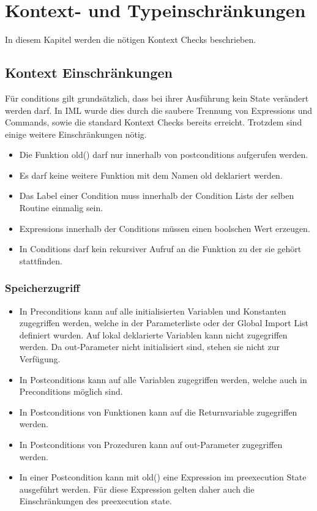 \section{Kontext- und Typeinschränkungen}
\label{sec:constraints}
In diesem Kapitel werden die nötigen Kontext Checks beschrieben.

\subsection{Kontext Einschränkungen}

Für conditions gilt grundsätzlich, dass bei ihrer Ausführung kein State verändert werden 
darf. In IML wurde dies durch die saubere Trennung von Expressions und Commands, sowie die standard
Kontext Checks bereits erreicht. Trotzdem sind einige weitere Einschränkungen nötig.

\begin{itemize}

\item Die Funktion old() darf nur innerhalb von postconditions aufgerufen werden.
\item Es darf keine weitere Funktion mit dem Namen old deklariert werden.
\item Das Label einer Condition muss innerhalb der Condition Lists der selben Routine einmalig sein.
\item Expressions innerhalb der Conditions müssen einen boolschen Wert erzeugen.
\item In Conditions darf kein rekursiver Aufruf an die Funktion zu der sie gehört stattfinden.

\end{itemize}

\subsubsection{Speicherzugriff}

\begin{itemize}
\item In Preconditions kann auf alle initialisierten Variablen und Konstanten zugegriffen werden, welche 
in der Parameterliste oder der Global Import List definiert wurden. Auf lokal deklarierte Variablen 
kann nicht zugegriffen werden. Da out-Parameter nicht initialisiert sind, stehen sie nicht zur
Verfügung.
\item In Postconditions kann auf alle Variablen zugegriffen werden, welche auch in 
Preconditions möglich sind. 
\item In Postconditions von Funktionen kann auf die Returnvariable zugegriffen werden.
\item In Postconditions von Prozeduren kann auf out-Parameter zugegriffen werden.
\item In einer Postcondition kann mit old() eine Expression im preexecution State ausgeführt werden. Für diese Expression 
gelten daher auch die Einschränkungen des preexecution state.

\end{itemize}



